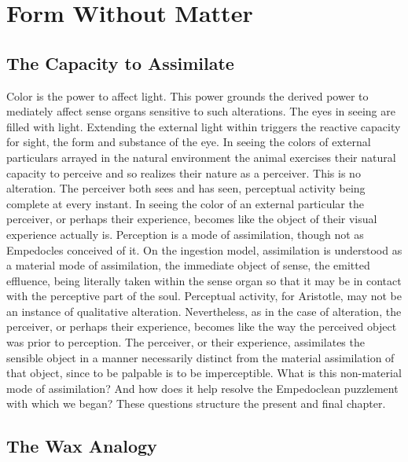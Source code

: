 \chapter{Form Without Matter} %
\label{cha:form_without_matter}

\section{The Capacity to Assimilate} %
\label{sec:the_capacity_to_assimilate}

Color is the power to affect light. This power grounds the derived power to mediately affect sense organs sensitive to such alterations. The eyes in seeing are filled with light. Extending the external light within triggers the reactive capacity for sight, the form and substance of the eye. In seeing the colors of external particulars arrayed in the natural environment the animal exercises their natural capacity to perceive and so realizes their nature as a perceiver. This is no alteration. The perceiver both sees and has seen, perceptual activity being complete at every instant. In seeing the color of an external particular the perceiver, or perhaps their experience, becomes like the object of their visual experience actually is. Perception is a mode of assimilation, though not as Empedocles conceived of it. On the ingestion model, assimilation is understood as a material mode of assimilation, the immediate object of sense, the emitted effluence, being literally taken within the sense organ so that it may be in contact with the perceptive part of the soul. Perceptual activity, for Aristotle, may not be an instance of qualitative alteration. Nevertheless, as in the case of alteration, the perceiver, or perhaps their experience, becomes like the way the perceived object was prior to perception. The perceiver, or their experience, assimilates the sensible object in a manner necessarily distinct from the material assimilation of that object, since to be palpable is to be imperceptible. What is this non-material mode of assimilation? And how does it help resolve the Empedoclean puzzlement with which we began? These questions structure the present and final chapter. 


\section{The Wax Analogy} %
\label{sec:the_wax_analogy}

